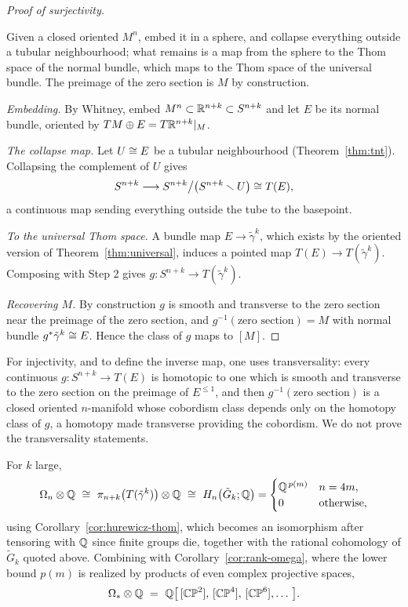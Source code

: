 \begin{proof}[Proof of surjectivity]
\begin{strategy}
Given a closed oriented $M^n$, embed it in a sphere, and collapse everything
outside a tubular neighbourhood; what remains is a map from the sphere to the
Thom space of the normal bundle, which maps to the Thom space of the universal
bundle. The preimage of the zero section is $M$ by construction.
\end{strategy}

 \emph{Embedding.} By Whitney, embed $M^n\subset\mathbb{R}^{n+k}\subset S^{n+k}$
and let $E$ be its normal bundle, oriented by
$TM\oplus E=T\mathbb{R}^{n+k}|_M$.

 \emph{The collapse map.} Let $U\cong E$ be a tubular neighbourhood
(Theorem~\ref{thm:tnt}). Collapsing the complement of $U$ gives
\[
S^{n+k}\longrightarrow S^{n+k}\big/\big(S^{n+k}\smallsetminus U\big)\cong T(E),
\]
a continuous map sending everything outside the tube to the basepoint.

 \emph{To the universal Thom space.} A bundle map $E\to\tilde\gamma^k$,
which exists by the oriented version of Theorem~\ref{thm:universal}, induces a
pointed map $T(E)\to T(\tilde\gamma^k)$. Composing with Step 2 gives
$g\colon S^{n+k}\to T(\tilde\gamma^k)$.

 \emph{Recovering $M$.} By construction $g$ is smooth and transverse to
the zero section near the preimage of the zero section, and
$g^{-1}(\text{zero section})=M$ with normal bundle $g^*\tilde\gamma^k\cong E$.
Hence the class of $g$ maps to $[M]$.
\end{proof}

\begin{remark}[quoted]
For injectivity, and to define the inverse map, one uses transversality: every
continuous $g\colon S^{n+k}\to T(E)$ is homotopic to one which is smooth and
transverse to the zero section on the preimage of $E^{\le1}$, and then
$g^{-1}(\text{zero section})$ is a closed oriented $n$-manifold whose cobordism
class depends only on the homotopy class of $g$, a homotopy made transverse
providing the cobordism. We do not prove the transversality statements.
\end{remark}

\begin{corollary}
For $k$ large,
\[
\Omega_n\otimes\Q\ \iso\ \pi_{n+k}\big(T(\tilde\gamma^k)\big)\otimes\Q
\ \iso\ H_n\big(\tilde G_k;\Q\big)
=\begin{cases}
\Q^{\,p(m)} & n=4m,\\
0 & \text{otherwise,}
\end{cases}
\]
using Corollary~\ref{cor:hurewicz-thom}, which becomes an isomorphism after
tensoring with $\mathbb{Q}$ since finite groups die, together with the rational
cohomology of $\tilde G_k$ quoted above. Combining with
Corollary~\ref{cor:rank-omega}, where the lower bound $p(m)$ is realized by
products of even complex projective spaces,
\[
\Omega_*\otimes\Q\ =\ \Q\big[\,[\CP^2],\,[\CP^4],\,[\CP^6],\dots\,\big].
\]
\end{corollary}

